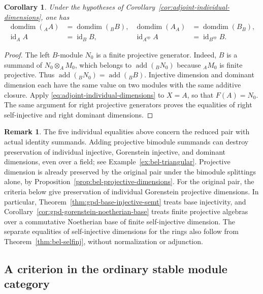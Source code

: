 \documentclass[12pt,a4paper,english,reqno]{amsart}
\numberwithin{equation}{section}
\theoremstyle{plain}
\newtheorem{corollary}[theorem]{Corollary}
\theoremstyle{definition}
\newtheorem{remark}[theorem]{Remark}
\begin{document}
\begin{corollary}
\label{cor:adjoint-algebra-dimensions}
Under the hypotheses of Corollary~\ref{cor:adjoint-individual-dimensions},
one has
\[
 \begin{aligned}
 \operatorname{domdim}({}_AA)&=\operatorname{domdim}({}_BB),&
 \operatorname{domdim}(A_A)&=\operatorname{domdim}(B_B),\\
 \operatorname{id}_A A&=\operatorname{id}_B B,&
 \operatorname{id}_{A^{\mathrm{op}}}A
   &=\operatorname{id}_{B^{\mathrm{op}}}B.
 \end{aligned}
\]
\end{corollary}

\begin{proof}
The left $B$-module $N_0$ is a finite projective generator.  Indeed,
$B$ is a summand of $N_0\otimes_A M_0$, which belongs to
$\operatorname{add}({}_B N_0)$ because $ {}_A M_0$ is finite projective.
Thus $\operatorname{add}({}_B N_0)=\operatorname{add}({}_B B)$.
Injective dimension and dominant dimension each have the same value
on two modules with the same additive closure.  Apply
\eqref{eq:adjoint-individual-dimensions} to $X=A$, so that $F(A)=N_0$.
The same argument for right projective generators proves the
equalities of right self-injective and right dominant dimensions.
\end{proof}

\begin{remark}
\label{rem:adjoint-normalized-versus-original}
The five individual equalities above concern the reduced pair with
actual identity summands.  Adding projective bimodule summands can
destroy preservation of individual injective, Gorenstein injective,
and dominant dimensions, even over a field; see
Example~\ref{ex:bel-triangular}.  Projective dimension is already
preserved by the original pair under the bimodule splittings alone,
by Proposition~\ref{prop:bel-projective-dimensions}.
For the original pair, the criteria below give preservation of
individual Gorenstein projective dimensions.  In particular,
Theorem~\ref{thm:gpd-base-injective-semt} treats base injectivity, and
Corollary~\ref{cor:gpd-gorenstein-noetherian-base} treats finite
projective algebras over a commutative Noetherian base of finite
self-injective dimension.  The separate equalities of self-injective
dimensions for the rings also follow from
Theorem~\ref{thm:bel-selfinj}, without normalization or adjunction.
\end{remark}

\subsection{A criterion in the ordinary stable module category}
\end{document}
